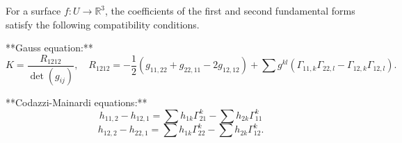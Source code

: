 For a surface $f: U \to \mathbb{R}^3$, the coefficients of the first and second fundamental forms satisfy the following compatibility conditions.

**Gauss equation:**
$$K = \frac{R_{1212}}{\det(g_{ij})}, \quad R_{1212} = -\frac{1}{2}(g_{11,22} + g_{22,11} - 2g_{12,12}) + \sum g^{kl}(\Gamma_{11,k}\Gamma_{22,l} - \Gamma_{12,k}\Gamma_{12,l}).$$

**Codazzi-Mainardi equations:**
$$h_{11,2} - h_{12,1} = \sum h_{1k}\Gamma_{21}^k - \sum h_{2k}\Gamma_{11}^k$$
$$h_{12,2} - h_{22,1} = \sum h_{1k}\Gamma_{22}^k - \sum h_{2k}\Gamma_{12}^k.$$